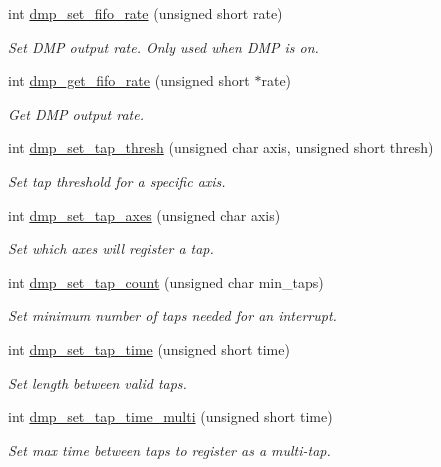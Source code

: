 \begin{DoxyCompactItemize}
int \hyperlink{group___d_r_i_v_e_r_s_ga5399728fd572a7694af20286cc9d4121}{dmp\+\_\+set\+\_\+fifo\+\_\+rate} (unsigned short rate)
\begin{DoxyCompactList}\small\item\em Set D\+MP output rate. Only used when D\+MP is on. \end{DoxyCompactList}\item 
int \hyperlink{group___d_r_i_v_e_r_s_gaf3f9953bc04af751b1101700daffa951}{dmp\+\_\+get\+\_\+fifo\+\_\+rate} (unsigned short $\ast$rate)
\begin{DoxyCompactList}\small\item\em Get D\+MP output rate. \end{DoxyCompactList}\item 
int \hyperlink{group___d_r_i_v_e_r_s_ga15da67c0a6c94e0cdaceb8b165e13af9}{dmp\+\_\+set\+\_\+tap\+\_\+thresh} (unsigned char axis, unsigned short thresh)
\begin{DoxyCompactList}\small\item\em Set tap threshold for a specific axis. \end{DoxyCompactList}\item 
int \hyperlink{group___d_r_i_v_e_r_s_ga66bc5c8fc26fcb498df53fc62aa87e4f}{dmp\+\_\+set\+\_\+tap\+\_\+axes} (unsigned char axis)
\begin{DoxyCompactList}\small\item\em Set which axes will register a tap. \end{DoxyCompactList}\item 
int \hyperlink{group___d_r_i_v_e_r_s_ga819f947b2cb107ada7b9a94c41be0dad}{dmp\+\_\+set\+\_\+tap\+\_\+count} (unsigned char min\+\_\+taps)
\begin{DoxyCompactList}\small\item\em Set minimum number of taps needed for an interrupt. \end{DoxyCompactList}\item 
int \hyperlink{group___d_r_i_v_e_r_s_ga97466067f4a23368f4d7e2547fe359d9}{dmp\+\_\+set\+\_\+tap\+\_\+time} (unsigned short time)
\begin{DoxyCompactList}\small\item\em Set length between valid taps. \end{DoxyCompactList}\item 
int \hyperlink{group___d_r_i_v_e_r_s_gaeca250a90eb816eb2609229849481337}{dmp\+\_\+set\+\_\+tap\+\_\+time\+\_\+multi} (unsigned short time)
\begin{DoxyCompactList}\small\item\em Set max time between taps to register as a multi-\/tap. \end{DoxyCompactList}\item 

\end{DoxyCompactItemize}
